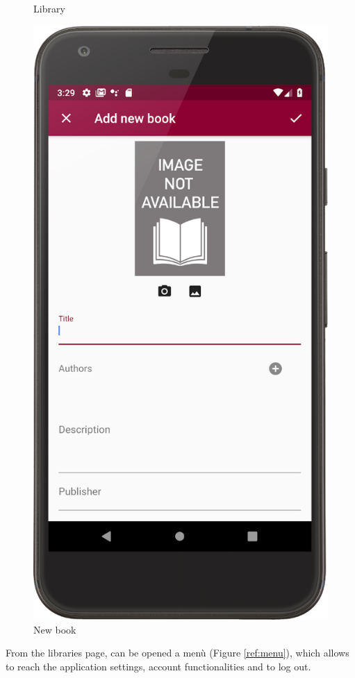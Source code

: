 \begin{figure}[!htb]
\begin{minipage}[b]{0.3\textwidth}
        \caption{Library}
        \label{ref:librarypage}
    \end{minipage}
    \hfill
    \begin{minipage}[b]{0.3\textwidth}
        \centering
        \includegraphics[scale=1]{images/add-new-book-dialog.png}
        \caption{New book}
        \label{ref:addnewbook}
    \end{minipage}
\end{figure}
From the libraries page, can be opened a menù (Figure \ref{ref:menu}), which allows to reach the application settings, 
account functionalities and to log out.

